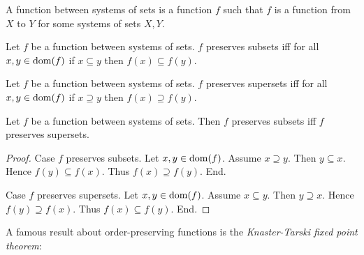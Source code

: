\documentclass[../../set-theory.ftl.tex]{subfiles}
\begin{document}
  \begin{forthel}
    \begin{definition}
      A function between systems of sets is a function $f$ such that $f$ is a function from $X$ to $Y$ for some systems of sets $X, Y$.
    \end{definition}

    \begin{definition}
      Let $f$ be a function between systems of sets.
      $f$ preserves subsets iff for all $x,y \in \operatorname{dom}(f)$ if $x \subseteq y$ then $f(x) \subseteq f(y)$.
    \end{definition}

    \begin{definition}
      Let $f$ be a function between systems of sets.
      $f$ preserves supersets iff for all $x,y \in \operatorname{dom}(f)$ if $x \supseteq y$ then $f(x) \supseteq f(y)$.
    \end{definition}

    \begin{lemma}
      Let $f$ be a function between systems of sets.
      Then $f$ preserves subsets iff $f$ preserves supersets.
    \end{lemma}
    \begin{proof}
      Case $f$ preserves subsets.
        Let $x,y \in \operatorname{dom}(f)$.
        Assume $x \supseteq y$.
        Then $y \subseteq x$.
        Hence $f(y) \subseteq f(x)$.
        Thus $f(x) \supseteq f(y)$.
      End.

      Case $f$ preserves supersets.
        Let $x,y \in \operatorname{dom}(f)$.
        Assume $x \subseteq y$.
        Then $y \supseteq x$.
        Hence $f(y) \supseteq f(x)$.
        Thus $f(x) \subseteq f(y)$.
      End.
    \end{proof}
  \end{forthel}

  \noindent A famous result about order-preserving functions is the
  \textit{Knaster-Tarski fixed point theorem}:
\end{document}
